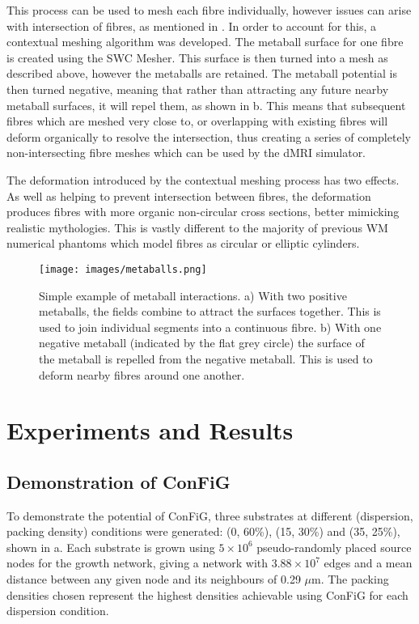 This process can be used to mesh each fibre individually, however issues can arise with intersection of fibres, as mentioned in .
In order to account for this, a contextual meshing algorithm was developed.
The metaball surface for one fibre is created using the SWC Mesher.
This surface is then turned into a mesh as described above, however the metaballs are retained.
The metaball potential is then turned negative, meaning that rather than attracting any future nearby metaball surfaces, it will repel them, as shown in b.
This means that subsequent fibres which are meshed very close to, or overlapping with existing fibres will deform organically to resolve the intersection, thus creating a series of completely non-intersecting fibre meshes which can be used by the dMRI simulator.

The deformation introduced by the contextual meshing process has two effects.
As well as helping to prevent intersection between fibres, the deformation produces fibres with more organic non-circular cross sections, better mimicking realistic mythologies.
This is vastly different to the majority of previous WM numerical phantoms which model fibres as circular or elliptic cylinders.


\begin{figure}
  \centering
  \texttt{[image: images/metaballs.png]}
  \caption{\small Simple example of metaball interactions. a) With two positive metaballs, the fields combine to attract the surfaces together. This is used to join individual segments into a continuous fibre. b) With one negative metaball (indicated by the flat grey circle) the surface of the metaball is repelled from the negative metaball. This is used to deform nearby fibres around one another.}
  \label{fig:metaballs}
\end{figure}



\section{Experiments and Results}
\label{sec:experiments_and_results}
\subsection{Demonstration of ConFiG}
\label{sec:method_demonstration}
To demonstrate the potential of ConFiG, three substrates at different (dispersion, packing density) conditions were generated: (0\degree, 60\%), (15\degree, 30\%) and (35\degree, 25\%), shown in a.
Each substrate is grown using $5 \times 10^6$ pseudo-randomly placed source nodes for the growth network, giving a network with $3.88\times10^7$  edges and a mean distance between any given node and its neighbours of 0.29 $\mu$m.
The packing densities chosen represent the highest densities achievable using ConFiG for each dispersion condition.


